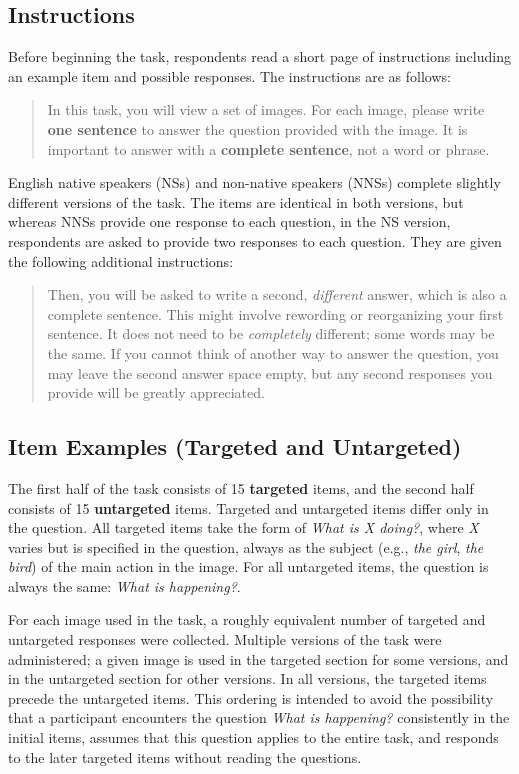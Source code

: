 \documentclass[12pt,notitlepage]{article}
\begin{document}
\subsection{Instructions} 
Before beginning the task, respondents read a short page of instructions including an example item and possible responses. The instructions are as follows:

\begin{quotation}\noindent
In this task, you will view a set of images. For each image, please write \textbf{one sentence} to answer the question provided with the image. It is important to answer with a \textbf{complete sentence}, not a word or phrase.
\end{quotation}

English native speakers (NSs) and non-native speakers (NNSs) complete slightly different versions of the task. The items are identical in both versions, but whereas NNSs provide one response to each question, in the NS version, respondents are asked to provide two responses to each question. They are given the following additional instructions:

\begin{quotation}\noindent
Then, you will be asked to write a second, \textit{different} answer, which is also a complete sentence. This might involve rewording or reorganizing your first sentence. It does not need to be \textit{completely} different; some words may be the same. If you cannot think of another way to answer the question, you may leave the second answer space empty, but any second responses you provide will be greatly appreciated.
\end{quotation}

\subsection{Item Examples (Targeted and Untargeted)}

The first half of the task consists of 15 \textbf{targeted} items, and the second half consists of 15 \textbf{untargeted} items. Targeted and untargeted items differ only in the question. All targeted items take the form of \textit{What is X doing?}, where \textit{X} varies but is specified in the question, always as the subject (e.g., \textit{the girl}, \textit{the bird}) of the main action in the image. For all untargeted items, the question is always the same: \textit{What is happening?}.

For each image used in the task, a roughly equivalent number of targeted and untargeted responses were collected. Multiple versions of the task were administered; a given image is used in the targeted section for some versions, and in the untargeted section for other versions. In all versions, the targeted items precede the untargeted items. This ordering is intended to avoid the possibility that a participant encounters the question \textit{What is happening?} consistently in the initial items, assumes that this question applies to the entire task, and responds to the later targeted items without reading the questions.
\end{document}
